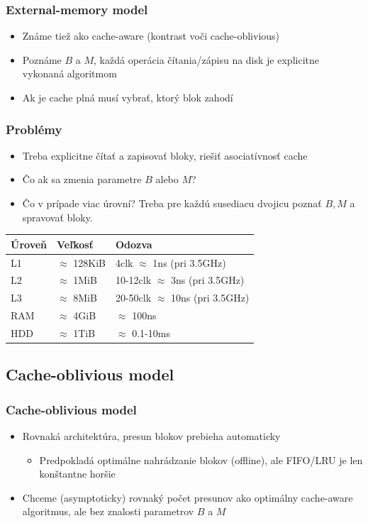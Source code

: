 \documentclass{beamer}
\begin{document}
\begin{frame}
	\frametitle{External-memory model}
	\begin{itemize}
		\item Známe tiež ako cache-aware (kontrast voči cache-oblivious)
		\item Poznáme $B$ a $M$, každá operácia čítania/zápisu na disk je explicitne vykonaná algoritmom
		\item Ak je cache plná musí vybrať, ktorý blok zahodí
	\end{itemize}
\end{frame}

\begin{frame}
	\frametitle{Problémy}
	\begin{itemize}
		\item Treba explicitne čítať a zapisovať bloky, riešiť asociatívnosť cache
		\item Čo ak sa zmenia parametre $B$ alebo $M$?
		\item Čo v prípade viac úrovní? Treba pre každú susediacu dvojicu poznať $B, M$  a spravovať bloky.
	\end{itemize}
	\begin{center}
		\begin{tabular}{|l|l|l|}
			\hline
			Úroveň & Veľkosť & Odozva \\ \hline
			L1 & $\approx$ 128KiB & 4clk $\approx$ 1ns (pri 3.5GHz) \\ \hline
			L2 & $\approx$ 1MiB & 10-12clk $\approx$ 3ns (pri 3.5GHz) \\ \hline
			L3 & $\approx$ 8MiB & 20-50clk $\approx$ 10ns (pri 3.5GHz) \\ \hline
			RAM & $\approx$ 4GiB & $\approx$ 100ns \\ \hline
			HDD & $\approx$ 1TiB & $\approx$ 0.1-10ms \\
			\hline
		\end{tabular}
	\end{center}
\end{frame}

\subsection{Cache-oblivious model}
\begin{frame}
	\frametitle{Cache-oblivious model}
	\begin{itemize}
		\item Rovnaká architektúra, presun blokov prebieha automaticky
		\begin{itemize}
			\item Predpokladá optimálne nahrádzanie blokov (offline), ale FIFO/LRU je len konštantne horšie
		\end{itemize}
		\item Chceme (asymptoticky) rovnaký počet presunov ako optimálny cache-aware algoritmus, ale bez znalosti parametrov $B$ a $M$
	\end{itemize}
\end{frame}
\end{document}
